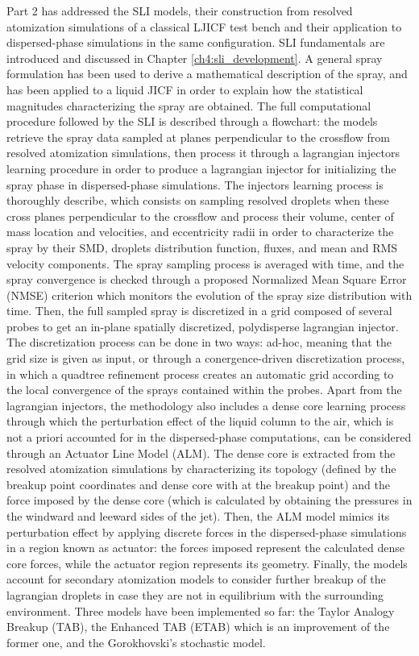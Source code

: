 Part 2 has addressed the SLI models, their construction from resolved atomization simulations of a classical LJICF test bench and their application to dispersed-phase simulations in the same configuration. SLI fundamentals are introduced and discussed in Chapter \ref{ch4:sli_development}. A general spray formulation has been used to derive  a mathematical description of the spray, and has been applied to a liquid JICF in order to explain how the statistical magnitudes characterizing the spray are obtained. The full computational procedure followed by the SLI is described through a flowchart: the models retrieve the spray data sampled at planes perpendicular to the crossflow from resolved atomization simulations, then process it through a lagrangian injectors learning procedure in order to produce a lagrangian injector for initializing the spray phase in dispersed-phase simulations. The injectors learning process is thoroughly describe, which consists on sampling resolved droplets when these cross planes perpendicular to the crossflow and process their volume, center of mass location and velocities, and eccentricity radii in order to characterize the spray by their SMD, droplets distribution function, fluxes, and mean and RMS velocity components. The spray sampling process is averaged with time, and the spray convergence is checked through a proposed Normalized Mean Square Error (NMSE) criterion which monitors the evolution of the spray size distribution with time. Then, the full sampled spray is discretized in a grid composed of several probes to get an in-plane spatially discretized, polydisperse lagrangian injector. The discretization process can be done in two ways: ad-hoc, meaning that the grid size is given as input, or through a conergence-driven discretization process, in which a quadtree refinement process creates an automatic grid according to the local convergence of the sprays contained within the probes. Apart from the lagrangian injectors, the methodology also includes a dense core learning process through which the perturbation effect of the liquid column to the air, which is not a priori accounted for in the dispersed-phase computations, can be considered through an Actuator Line Model (ALM). The dense core is extracted from the resolved atomization simulations by characterizing its topology (defined by the breakup point coordinates and dense core with at the breakup point) and the force imposed by the dense core (which is calculated by obtaining the pressures in the windward and leeward sides of the jet). Then, the ALM model mimics its perturbation effect by applying discrete forces in the dispersed-phase simulations in a region known as actuator: the forces imposed represent the calculated dense core forces, while the actuator region represents its geometry. Finally, the models account for secondary atomization models to consider further breakup of the lagrangian droplets in case they are not in equilibrium with the surrounding environment. Three models have been implemented so far: the Taylor Analogy Breakup (TAB), the Enhanced TAB (ETAB) which is an improvement of the former one, and the Gorokhovski's stochastic model.

